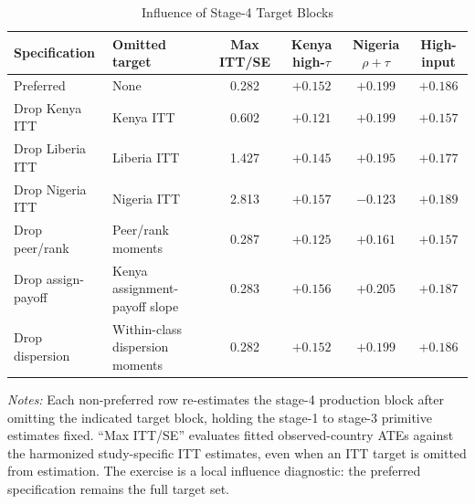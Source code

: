 \begin{table}[H]
\centering
\caption{Influence of Stage-4 Target Blocks}
\label{tab:struct_influence}
\begin{threeparttable}
\scriptsize
\setlength{\tabcolsep}{3pt}
\begin{tabular}[t]{l>{\raggedright\arraybackslash}p{2.55cm}cccc}
\toprule
Specification & Omitted target & Max ITT/SE & Kenya high-$\tau$ & Nigeria $\rho+\tau$ & High-input \\
\midrule
Preferred & None & 0.282 & $+0.152$ & $+0.199$ & $+0.186$ \\
Drop Kenya ITT & Kenya ITT & 0.602 & $+0.121$ & $+0.199$ & $+0.157$ \\
Drop Liberia ITT & Liberia ITT & 1.427 & $+0.145$ & $+0.195$ & $+0.177$ \\
Drop Nigeria ITT & Nigeria ITT & 2.813 & $+0.157$ & $-0.123$ & $+0.189$ \\
Drop peer/rank & Peer/rank moments & 0.287 & $+0.125$ & $+0.161$ & $+0.157$ \\
Drop assign-payoff & Kenya assignment-payoff slope & 0.283 & $+0.156$ & $+0.205$ & $+0.187$ \\
Drop dispersion & Within-class dispersion moments & 0.282 & $+0.152$ & $+0.199$ & $+0.186$ \\
\bottomrule
\end{tabular}
\begin{tablenotes}
\footnotesize
\item \textit{Notes:} Each non-preferred row re-estimates the stage-4 production block after omitting the indicated target block, holding the stage-1 to stage-3 primitive estimates fixed. ``Max ITT/SE'' evaluates fitted observed-country ATEs against the harmonized study-specific ITT estimates, even when an ITT target is omitted from estimation. The exercise is a local influence diagnostic: the preferred specification remains the full target set.
\end{tablenotes}
\end{threeparttable}
\end{table}
